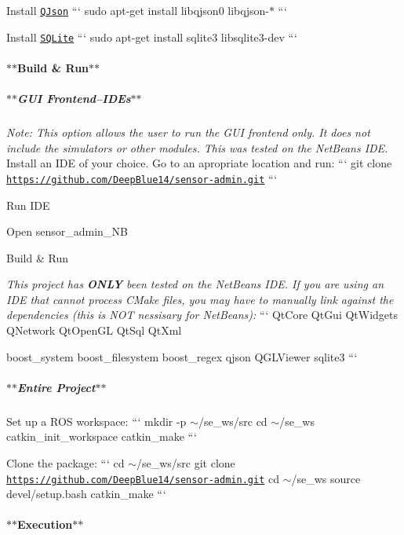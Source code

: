Install \href{http://qjson.sourceforge.net/}{\tt Q\-Json} ``` sudo apt-\/get install libqjson0 libqjson-\/$\ast$ ```

Install \href{https://sqlite.org/}{\tt S\-Q\-Lite} ``` sudo apt-\/get install sqlite3 libsqlite3-\/dev ```

\paragraph*{$\ast$$\ast$\-Build \& Run$\ast$$\ast$}

\subparagraph*{$\ast$$\ast$\-G\-U\-I Frontend--I\-D\-Es$\ast$$\ast$}

{\itshape Note\-: This option allows the user to run the G\-U\-I frontend only. It does not include the simulators or other modules. This was tested on the Net\-Beans I\-D\-E.} Install an I\-D\-E of your choice. Go to an apropriate location and run\-: ``` git clone \href{https://github.com/DeepBlue14/sensor-admin.git}{\tt https\-://github.\-com/\-Deep\-Blue14/sensor-\/admin.\-git} ```


\begin{DoxyItemize}
\item Run I\-D\-E
\item Open {\ttfamily sensor\-\_\-admin\-\_\-\-N\-B}
\item Build \& Run
\end{DoxyItemize}

{\itshape This project has {\bfseries O\-N\-L\-Y} been tested on the Net\-Beans I\-D\-E. If you are using an I\-D\-E that cannot process C\-Make files, you may have to manually link against the dependencies (this is N\-O\-T nessisary for Net\-Beans)\-:} ``` Qt\-Core Qt\-Gui Qt\-Widgets Q\-Network Qt\-Open\-G\-L Qt\-Sql Qt\-Xml

boost\-\_\-system boost\-\_\-filesystem boost\-\_\-regex qjson Q\-G\-L\-Viewer sqlite3 ```

\subparagraph*{$\ast$$\ast$\-Entire Project$\ast$$\ast$}

Set up a R\-O\-S workspace\-: ``` mkdir -\/p $\sim$/se\-\_\-ws/src cd $\sim$/se\-\_\-ws catkin\-\_\-init\-\_\-workspace catkin\-\_\-make ```

Clone the package\-: ``` cd $\sim$/se\-\_\-ws/src git clone \href{https://github.com/DeepBlue14/sensor-admin.git}{\tt https\-://github.\-com/\-Deep\-Blue14/sensor-\/admin.\-git} cd $\sim$/se\-\_\-ws source devel/setup.\-bash catkin\-\_\-make ```

\paragraph*{$\ast$$\ast$\-Execution$\ast$$\ast$}

